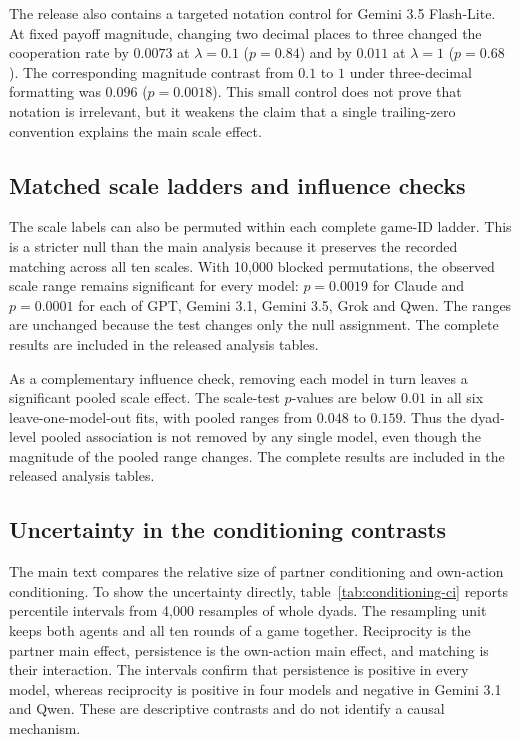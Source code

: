 \documentclass[openacc]{rsproca_new}
\begin{document}
The release also contains a targeted notation control for Gemini 3.5 Flash-Lite.
At fixed payoff magnitude, changing two decimal places to three changed the
cooperation rate by $0.0073$ at $\lambda=0.1$ ($p=0.84$) and by $0.011$ at
$\lambda=1$ ($p=0.68$). The corresponding magnitude contrast from $0.1$ to $1$
under three-decimal formatting was $0.096$ ($p=0.0018$). This small control
does not prove that notation is irrelevant, but it weakens the claim that a
single trailing-zero convention explains the main scale effect.


\subsection{Matched scale ladders and influence checks}\label{appendix:robust_ladders}

The scale labels can also be permuted within each complete game-ID ladder. This
is a stricter null than the main analysis because it preserves the recorded
matching across all ten scales. With 10,000 blocked permutations, the observed
scale range remains significant for every model: $p=0.0019$ for Claude and
$p=0.0001$ for each of GPT, Gemini 3.1, Gemini 3.5, Grok and Qwen. The ranges
are unchanged because the test changes only the null assignment. The complete
results are included in the released analysis tables.

As a complementary influence check, removing each model in turn leaves a
significant pooled scale effect. The scale-test $p$-values are below $0.01$ in
all six leave-one-model-out fits, with pooled ranges from $0.048$ to $0.159$.
Thus the dyad-level pooled association is not removed by any single model,
even though the magnitude of the pooled range changes. The complete results are included in the
released analysis tables.

\subsection{Uncertainty in the conditioning contrasts}\label{appendix:conditioning_ci}

The main text compares the relative size of partner conditioning and own-action
conditioning. To show the uncertainty directly, table~\ref{tab:conditioning-ci}
reports percentile intervals from 4,000 resamples of whole dyads. The resampling
unit keeps both agents and all ten rounds of a game together. Reciprocity is the
partner main effect, persistence is the own-action main effect, and matching is
their interaction. The intervals confirm that persistence is positive in every
model, whereas reciprocity is positive in four models and negative in Gemini
3.1 and Qwen. These are descriptive contrasts and do not identify a causal
mechanism.
\end{document}
